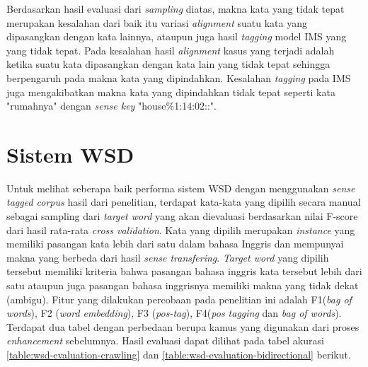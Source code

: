 Berdasarkan hasil evaluasi dari \textit{sampling} diatas, makna kata yang tidak tepat merupakan kesalahan dari baik itu variasi \textit{alignment} suatu kata yang dipasangkan dengan kata lainnya, ataupun juga hasil \textit{tagging} model IMS yang yang tidak tepat. Pada kesalahan hasil \textit{alignment} kasus yang terjadi adalah ketika suatu kata dipasangkan dengan kata lain yang tidak tepat sehingga berpengaruh pada makna kata yang dipindahkan. Kesalahan \textit{tagging} pada IMS juga mengakibatkan makna kata yang dipindahkan tidak tepat seperti kata "rumahnya" dengan \textit{sense key} "house\%1:14:02::". 
\section{Sistem WSD}

Untuk melihat seberapa baik performa sistem WSD dengan menggunakan \textit{sense tagged corpus} hasil dari penelitian, terdapat kata-kata yang dipilih secara manual sebagai sampling dari \textit{target word} yang akan dievaluasi berdasarkan nilai F-score dari hasil rata-rata \textit{cross validation}. Kata yang dipilih merupakan \textit{instance} yang memiliki pasangan kata lebih dari satu dalam bahasa Inggris dan mempunyai makna yang berbeda dari hasil \textit{sense transfering}. \textit{Target word} yang dipilih tersebut memiliki kriteria bahwa pasangan bahasa inggris kata tersebut lebih dari satu ataupun juga pasangan bahasa inggrisnya memiliki makna yang tidak dekat (ambigu). Fitur yang dilakukan percobaan pada penelitian ini adalah F1(\textit{bag of words}), F2 (\textit{word embedding}), F3 (\textit{pos-tag}), F4(\textit{pos tagging} dan \textit{bag of words}). Terdapat dua tabel dengan perbedaan berupa kamus yang digunakan dari proses \textit{enhancement} sebelumnya. Hasil evaluasi dapat dilihat pada tabel akurasi  \ref{table:wsd-evaluation-crawling} dan \ref{table:wsd-evaluation-bidirectional} berikut.

